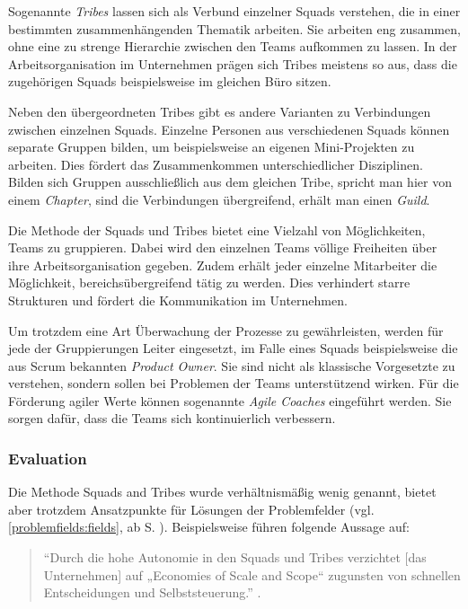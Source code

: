 Sogenannte \textit{Tribes} lassen sich als Verbund einzelner Squads verstehen, die in einer bestimmten zusammenhängenden Thematik arbeiten. Sie arbeiten eng zusammen, ohne eine zu strenge Hierarchie zwischen den Teams aufkommen zu lassen. In der Arbeitsorganisation im Unternehmen prägen sich Tribes meistens so aus, dass die zugehörigen Squads beispielsweise im gleichen Büro sitzen.  \cite[S. 3]{kniberg_scaling_2012}

Neben den übergeordneten Tribes gibt es andere Varianten zu Verbindungen zwischen einzelnen Squads. Einzelne Personen aus verschiedenen Squads können separate Gruppen bilden, um beispielsweise an eigenen Mini-Projekten zu arbeiten. Dies fördert das Zusammenkommen unterschiedlicher Disziplinen. Bilden sich Gruppen ausschließlich aus dem gleichen Tribe, spricht man hier von einem \textit{Chapter}, sind die Verbindungen übergreifend, erhält man einen \textit{Guild}. \cite[S. 9f.]{kniberg_scaling_2012}

Die Methode der Squads und Tribes bietet eine Vielzahl von Möglichkeiten, Teams zu gruppieren. Dabei wird den einzelnen Teams völlige Freiheiten über ihre Arbeitsorganisation gegeben. Zudem erhält jeder einzelne Mitarbeiter die Möglichkeit, bereichsübergreifend tätig zu werden. Dies verhindert starre Strukturen und fördert die Kommunikation im Unternehmen. 

Um trotzdem eine Art Überwachung der Prozesse zu gewährleisten, werden für jede der Gruppierungen Leiter eingesetzt, im Falle eines Squads beispielsweise die aus Scrum bekannten \textit{Product Owner}. Sie sind nicht als klassische Vorgesetzte zu verstehen, sondern sollen bei Problemen der Teams unterstützend wirken. Für die Förderung agiler Werte können sogenannte \textit{Agile  Coaches} eingeführt werden. Sie sorgen dafür, dass die Teams sich kontinuierlich verbessern. \cite[S. 4]{kniberg_scaling_2012}

\subsubsection{Evaluation}

Die Methode Squads and Tribes wurde verhältnismäßig wenig  genannt, bietet aber trotzdem Ansatzpunkte für Lösungen der Problemfelder (vgl. \ref{problemfields:fields}, ab S. \pageref{problemfields:fields}). Beispielsweise führen  folgende Aussage auf:

\begin{quote}
	``Durch die hohe Autonomie in den Squads und Tribes verzichtet [das Unternehmen] auf „Economies of Scale and Scope“ zugunsten von schnellen Entscheidungen und Selbststeuerung.'' \cite[S. 98]{heinemann_digitale_2016}.
\end{quote}

